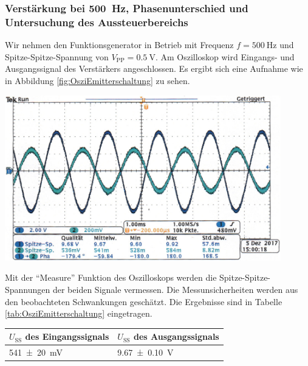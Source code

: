 \subsubsection*{Verstärkung bei \SI{500}{\hertz}, Phasenunterschied und Untersuchung des Aussteuerbereichs}
%
Wir nehmen den Funktionsgenerator in Betrieb mit Frequenz $f = \SI{500}{\hertz}$ und Spitze-Spitze-Spannung von $V_{\text{PP}} = \SI{0,5}{\volt}$.
Am Oszilloskop wird Eingangs- und Ausgangssignal des Verstärkers angeschlossen.
Es ergibt sich eine Aufnahme wie in Abbildung \ref{fig:OsziEmitterschaltung} zu sehen.
%
\par
%
\minipage{\linewidth}
    \begin{center}
        \captionsetup{type=figure}
        \begin{adjustbox}{max width=\linewidth, keepaspectratio}
            \includegraphics[width=120mm]{jpg/Emitterschaltung}
        \end{adjustbox}
        \label{fig:OsziEmitterschaltung}
    \end{center}
\endminipage
%
\par
%
Mit der \enquote{Measure} Funktion des Oszilloskops werden die Spitze-Spitze-Spannungen der beiden Signale vermessen.
Die Messunsicherheiten werden aus den beobachteten Schwankungen geschätzt.
Die Ergebnisse sind in Tabelle \ref{tab:OsziEmitterschaltung} eingetragen.
%
\par
%
\minipage{\linewidth}
    \begin{center}
        \captionsetup{type=table}
        \begin{adjustbox}{max width=\linewidth, keepaspectratio}
            \begin{tabular}{ll}
            \toprule
            $U_{\text{SS}}$ des Eingangssignals & $U_{\text{SS}}$ des Ausgangssignals \\
            \midrule
            \SI{541 \pm 20}{\milli\volt}        & \SI{9,67 \pm 0,10}{\volt}           \\
            \bottomrule
            \end{tabular}
        \end{adjustbox}
        \label{tab:OsziEmitterschaltung}
    \end{center}
